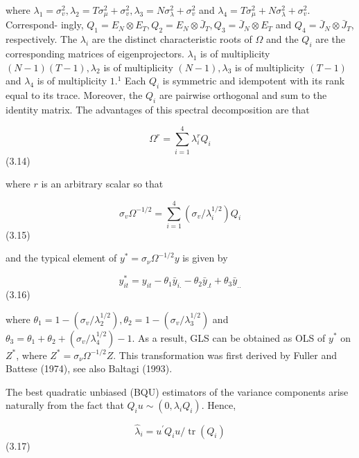 \documentclass[
]{book}
\begin{document}
where \(\lambda_{1}=\sigma_{v}^{2}, \lambda_{2}=T \sigma_{\mu}^{2}+\sigma_{v}^{2}, \lambda_{3}=N \sigma_{\lambda}^{2}+\sigma_{v}^{2}\) and \(\lambda_{4}=T \sigma_{\mu}^{2}+N \sigma_{\lambda}^{2}+\sigma_{v}^{2}\). Correspond-
ingly, \(Q_{1}=E_{N} \otimes E_{T}, Q_{2}=E_{N} \otimes \bar{J}_{T}, Q_{3}=\bar{J}_{N} \otimes E_{T}\) and \(Q_{4}=\bar{J}_{N} \otimes \bar{J}_{T}\), respectively.
The \(\lambda_{i}\) are the distinct characteristic roots of \(\Omega\) and the \(Q_{i}\) are the corresponding matrices of eigenprojectors. \(\lambda_{1}\) is of multiplicity \((N-1)(T-1), \lambda_{2}\) is of multiplicity \((N-1), \lambda_{3}\) is of multiplicity \((T-1)\) and \(\lambda_{4}\) is of multiplicity \(1 .{ }^{1}\) Each \(Q_{i}\) is symmetric and idempotent with its rank equal to its trace. Moreover, the \(Q_{i}\) are pairwise orthogonal and sum to the identity matrix. The advantages of this spectral decomposition are that

\begin{equation}
\Omega^{r} =\sum_{i=1}^{4} \lambda_{i}^{r} Q_{i}
\end{equation} (3.14)

where \(r\) is an arbitrary scalar so that

\begin{equation}
\sigma_{v} \Omega^{-1 / 2}=\sum_{i=1}^{4}\left(\sigma_{v} / \lambda_{i}^{1 / 2}\right) Q_{i}
\end{equation} (3.15)

and the typical element of \(y^{*}=\sigma_{\nu} \Omega^{-1 / 2} y\) is given by

\begin{equation}
y_{i t}^{*}=y_{i t}-\theta_{1} \bar{y}_{i .}-\theta_{2} \bar{y}_{. t}+\theta_{3} \bar{y}_{. .}
\end{equation} (3.16)

where \(\theta_{1}=1-\left(\sigma_{v} / \lambda_{2}^{1 / 2}\right), \theta_{2}=1-\left(\sigma_{v} / \lambda_{3}^{1 / 2}\right)\) and \(\theta_{3}=\theta_{1}+\theta_{2}+\left(\sigma_{v} / \lambda_{4}^{1 / 2}\right)-1\). As a result,
GLS can be obtained as OLS of \(y^{*}\) on \(Z^{*}\), where \(Z^{*}=\sigma_{\nu} \Omega^{-1 / 2} Z\). This transformation was first derived by Fuller and Battese (1974), see also Baltagi (1993).

The best quadratic unbiased (BQU) estimators of the variance components arise naturally from the fact that \(Q_{i} u \sim\left(0, \lambda_{i} Q_{i}\right) .\) Hence,

\begin{equation}
\widehat{\lambda}_{i}=u^{\prime} Q_{i} u / \operatorname{tr}\left(Q_{i}\right)
\end{equation} (3.17)
\end{document}
